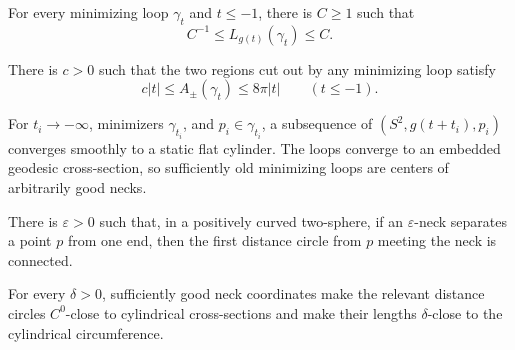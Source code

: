 \begin{proposition}
\label{prop:chow-iv-isoperimetric-loop-bounds}


For every minimizing loop \(\gamma_t\) and \(t\le-1\), there is \(C\ge1\)
such that
\[
 C^{-1}\le L_{g(t)}(\gamma_t)\le C.
\]
\end{proposition}

\begin{lemma}
\label{lem:chow-iv-isoperimetric-region-areas}


There is \(c>0\) such that the two regions cut out by any minimizing loop
satisfy
\[
 c|t|\le A_\pm(\gamma_t)\le8\pi|t|\qquad(t\le-1).
\]
\end{lemma}

\begin{lemma}
\label{lem:chow-iv-asymptotic-cylinder-minimizing-loop}


For \(t_i\to-\infty\), minimizers \(\gamma_{t_i}\), and
\(p_i\in\gamma_{t_i}\), a subsequence of
\((S^2,g(t+t_i),p_i)\) converges smoothly to a static flat cylinder.  The
loops converge to an embedded geodesic cross-section, so sufficiently old
minimizing loops are centers of arbitrarily good necks.
\end{lemma}

\begin{lemma}
\label{lem:chow-iv-connected-distance-circles}

There is \(\varepsilon>0\) such that, in a positively curved two-sphere, if
an \(\varepsilon\)-neck separates a point \(p\) from one end, then the first
distance circle from \(p\) meeting the neck is connected.
\end{lemma}

\begin{lemma}
\label{lem:chow-iv-distance-circles-near-neck-center}

For every \(\delta>0\), sufficiently good neck coordinates make the relevant
distance circles \(C^0\)-close to cylindrical cross-sections and make their
lengths \(\delta\)-close to the cylindrical circumference.
\end{lemma}

